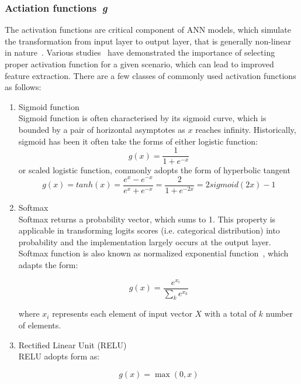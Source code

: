 \subsubsection{Actiation functions~\textit{g}}
The activation functions are critical component of ANN models, which simulate the transformation from input layer to output layer, that is generally non-linear in nature~\cite{LeCun_2015}. Various studies~\cite{Bengio_2012,Singh_2013} have demonstrated the importance of selecting proper activation function for a given scenario, which can lead to improved feature extraction. There are a few classes of commonly used activation functions as follows:
\begin{enumerate}
\item Sigmoid function \\
Sigmoid function is often characterised by its sigmoid curve, which is bounded by a pair of horizontal asymptotes as $x$ reaches infinity. Historically, sigmoid has been it often take the forms of either logistic function:
\begin{equation}
    g(x) = \frac{1} {1+ e^{-x}}
\end{equation}
or scaled logistic function, commonly adopts the form of hyperbolic tangent
\begin{equation}
    g(x) = tanh(x) = \frac{e^x-e^{-x}} {e^x + e^{-x}} = \frac {2} {1 + e^{-2x}} = 2 sigmoid(2x) - 1
\end{equation}

\item Softmax \\
Softmax returns a probability vector, which sums to 1. This property is applicable in transforming logits scores (i.e.  categorical distribution) into probability and the implementation largely occurs at the output layer. Softmax function is also known as normalized exponential function~\cite{Howard_2007}, which adapts the form: 

\begin{equation}
    g(x) = \frac{e^{x_i}} {\sum_k e^{x_k}}
\end{equation}

where $x_i$ represents each element of input vector $X$ with a total of $k$ number of elements. 

\item Rectified Linear Unit (RELU) \\
RELU adopts form as:

\begin{equation}
    g(x) = \max(0,x)
\end{equation}


\end{enumerate}
